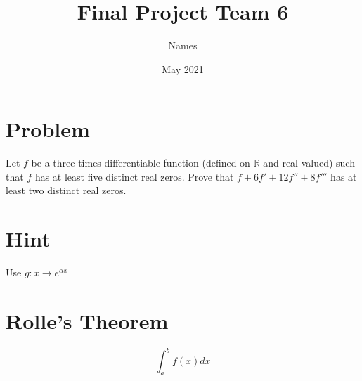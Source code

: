 \documentclass{article}
\title{Final Project Team 6}
\author{Names}
\date{May 2021}
\begin{document}
    \maketitle

    \section*{Problem}
    Let $f$ be a three times differentiable function (defined on $\mathbb{R}$
    and real-valued) such that $f$ has at least five distinct real zeros. 
    Prove that $f + 6f' + 12f'' + 8f'''$ has at least two distinct real zeros.

    \section*{Hint}
    Use $g : x \rightarrow  e^ {\alpha x} $

    \section*{Rolle's Theorem}

    $$ 
    \int_a^bf(x)dx
    $$
\end{document}
